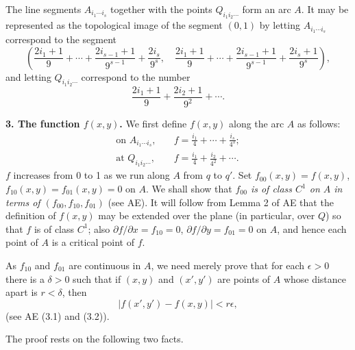\documentclass[11pt,a4paper,leqno,twoside]{article}
\newcommand{\sect}[1]{\par\medskip\noindent\textbf{#1}\enspace}
\begin{document}
The line segments $A_{i_1\cdots i_s}$ together with the points $Q_{i_1i_2\cdots}$ form an arc $A$. It may be represented as the topological image of the segment $(0,1)$ by letting $A_{i_1\cdots i_s}$ correspond to the segment
\[
\left(\frac{2i_1+1}{9}+\cdots+\frac{2i_{s-1}+1}{9^{s-1}}+\frac{2i_s}{9^s},\quad
\frac{2i_1+1}{9}+\cdots+\frac{2i_{s-1}+1}{9^{s-1}}+\frac{2i_s+1}{9^s}\right),
\]
\newpage %
\noindent and letting $Q_{i_1i_2\cdots}$ correspond to the number
\[\frac{2i_1+1}{9}+\frac{2i_2+1}{9^2}+\cdots.\]
\sect{3. The function $f(x,y)$.} We first define $f(x,y)$ along the arc $A$ as follows:
\[
\begin{aligned}
\text{on }A_{i_1\cdots i_s},\quad &f=\frac{i_1}{4}+\cdots+\frac{i_s}{4^s};\\[8pt]
\text{at }Q_{i_1i_2\cdots},\quad &f=\frac{i_1}{4}+\frac{i_2}{4^2}+\cdots.
\end{aligned}
\]
$f$ increases from 0 to 1 as we run along $A$ from $q$ to $q'$. Set $f_{00}(x,y)=f(x,y)$, $f_{10}(x,y)=f_{01}(x,y)=0$ on $A$. We shall show that \textit{$f_{00}$ is of class $C^1$ on $A$ in terms of $(f_{00},f_{10},f_{01})$} (see AE). It will follow from Lemma 2 of AE that the definition of $f(x,y)$ may be extended over the plane (in particular, over $Q$) so that $f$ is of class $C^1$; also $\partial f/\partial x=f_{10}=0$, $\partial f/\partial y=f_{01}=0$ on $A$, and hence each point of $A$ is a critical point of $f$.

As $f_{10}$ and $f_{01}$ are continuous in $A$, we need merely prove that for each $\epsilon>0$ there is a $\delta>0$ such that if $(x,y)$ and $(x',y')$ are points of $A$ whose distance apart is $r<\delta$, then
\begin{equation}\tag{1}|f(x',y')-f(x,y)|<r\epsilon,\end{equation}
(see AE (3.1) and (3.2)).

The proof rests on the following two facts.
\end{document}
